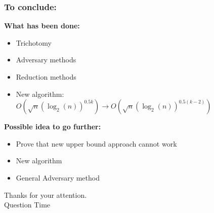 \documentclass[9pt, notheorems]{beamer}
\theoremstyle{definition}
\theoremstyle{plain}
\theoremstyle{definition}
\begin{document}
\begin{frame}
    \frametitle{To conclude:}
    \textbf{What has been done:}
    \begin{itemize}
        \item Trichotomy
        \item Adversary methods
        \item Reduction methods
        \item New algorithm: $O\left(\sqrt{n}(\log_2(n))^{0.5k}\right) \rightarrow O\left(\sqrt{n}(\log_2(n))^{0.5(k-2)} \right)$
    \end{itemize}
    \pause
    \textbf{Possible idea to go further:}
    \begin{itemize}
        \item Prove that new upper bound approach cannot work
        \item New algorithm
        \item General Adversary method
    \end{itemize}

\end{frame}


\begin{frame}
    \centering
    {\Huge
        Thanks for your attention.\\[1cm]

        Question Time\\[1cm]}


    
    

\end{frame}
\end{document}

